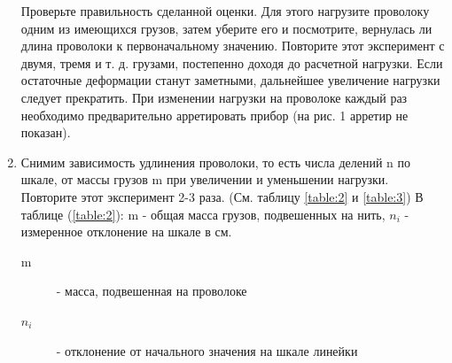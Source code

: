 \documentclass[a4paper,12pt]{article}
\numberwithin{equation}{section}
\begin{document}
\begin{enumerate}
  Проверьте правильность сделанной оценки. Для этого нагрузите проволоку одним из имеющихся грузов, затем уберите его и посмотрите, вернулась ли длина проволоки к первоначальному значению. Повторите этот эксперимент с двумя, тремя и т. д. грузами, постепенно доходя до расчетной нагрузки. Если остаточные деформации станут заметными, дальнейшее увеличение нагрузки следует прекратить. При изменении нагрузки на проволоке каждый раз необходимо предварительно арретировать прибор (на рис. 1 арретир не показан).

  \item \label{1:5}  Снимим зависимость удлинения проволоки, то есть числа делений n по шкале, от массы грузов m при увеличении и уменьшении нагрузки. Повторите этот эксперимент 2-3 раза. (См. таблицу \ref{table:2} и \ref{table:3}) В таблице (\ref{table:2}): m - общая масса грузов, подвешенных на нить, $n_i$ - измеренное отклонение на шкале в см.
  
\begin{table} [H] \center
{}
\caption{Измерения \label{table:2}}
\begin{description}
  \item[m] - масса, подвешенная на проволоке
  \item[$n_i$] - отклонение от начального значения на шкале линейки
\end{description}
\end{table}


\end{enumerate}
\end{document}
